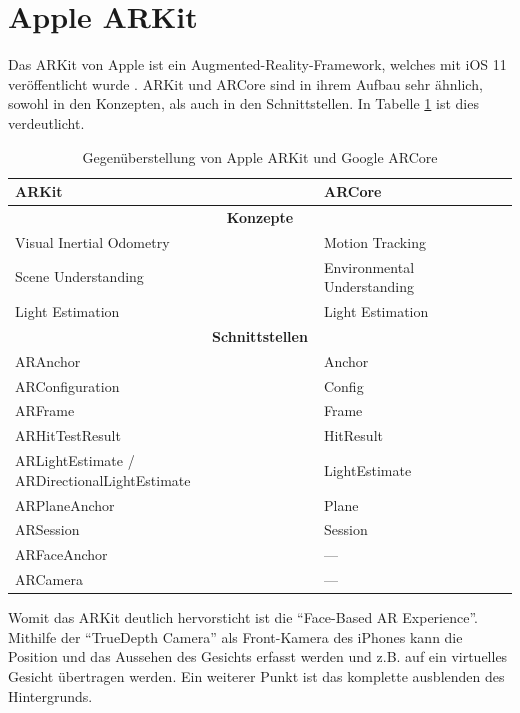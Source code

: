 
\section{Apple ARKit}
Das ARKit von Apple ist ein Augmented-Reality-Framework, welches mit iOS 11 veröffentlicht wurde \cite{apple_arkit}. ARKit und ARCore sind in ihrem Aufbau sehr ähnlich, sowohl in den Konzepten, als auch in den Schnittstellen. In Tabelle \ref{arkit_vs_arcore} ist dies verdeutlicht.

\begin{table}[h]
	\centering
	\begin{tabular}{|p{4cm}|p{4cm}|}
		\hline
		\textbf{ARKit} & \textbf{ARCore}\\
		\hline
		\multicolumn{2}{|c|}{\textbf{Konzepte}}\\
		\hline
		Visual Inertial Odometry & Motion Tracking\\
		Scene Understanding & Environmental Understanding\\
		Light Estimation & Light Estimation\\
		\hline
		\multicolumn{2}{|c|}{\textbf{Schnittstellen}}\\
		\hline
		ARAnchor & Anchor \\
		ARConfiguration & Config\\
		ARFrame & Frame\\
		ARHitTestResult & HitResult\\
		ARLightEstimate /
		\newline ARDirectionalLightEstimate & LightEstimate\newline\\
		ARPlaneAnchor & Plane\\
		ARSession & Session\\
		ARFaceAnchor & ---\\
		ARCamera & ---\\
		\hline
	\end{tabular}
	\caption{Gegenüberstellung von Apple ARKit\cite{arkit_reference} und Google ARCore\cite{arcore_android_reference}}
	\label{arkit_vs_arcore}
\end{table}


Womit das ARKit deutlich hervorsticht ist die "`Face-Based AR Experience"'. Mithilfe der "`TrueDepth Camera"' als Front-Kamera des iPhones kann die Position und das Aussehen des Gesichts erfasst werden und z.B. auf ein virtuelles Gesicht übertragen werden. Ein weiterer Punkt ist das komplette ausblenden des Hintergrunds.\cite{iphoneX}

